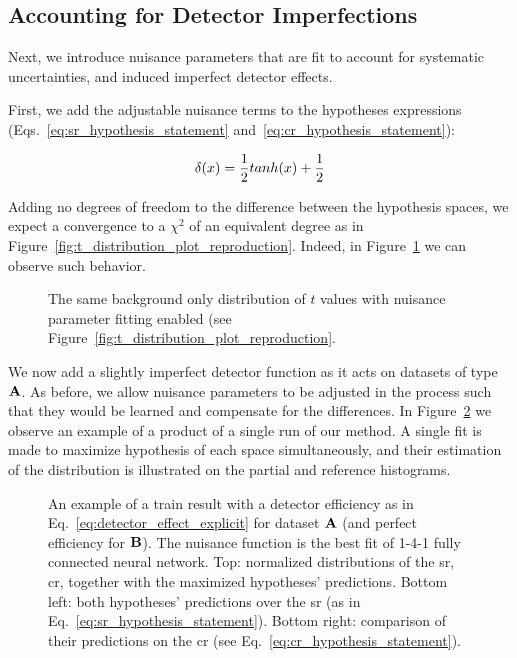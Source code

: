\documentclass[paper/ddppaper2.tex]{subfiles}
\begin{document}
\subsection{Accounting for Detector Imperfections}

Next, we introduce nuisance parameters that are fit to account for systematic uncertainties, and induced imperfect detector effects.

First, we add the adjustable nuisance terms to the hypotheses expressions (Eqs.~\ref{eq:sr_hypothesis_statement} and~\ref{eq:cr_hypothesis_statement}):

\begin{equation}
\label{eq:detector_effect_explicit}
    \delta(\eventsymbol) = \dfrac{1}{2}tanh(\eventsymbol) + \dfrac{1}{2}
\end{equation}

Adding no degrees of freedom to the difference between the hypothesis spaces, we expect a convergence to a $\chi^2$ of an equivalent degree as in Figure~\ref{fig:t_distribution_plot_reproduction}. Indeed, in Figure~\ref{fig:blank-background-with-nuisance} we can observe such behavior.

\begin{figure}
    \caption{The same background only distribution of $t$ values with nuisance parameter fitting enabled (see Figure~\ref{fig:t_distribution_plot_reproduction}.}
    \label{fig:blank-background-with-nuisance}
\end{figure}


We now add a slightly imperfect detector function as it acts on datasets of type ${\mathbf{A}}$. As before, we allow nuisance parameters to be adjusted in the process such that they would be learned and compensate for the differences. In Figure~\ref{fig:detector_effect_with_nuisance_train} we observe an example of a product of a single run of our method. A single fit is made to maximize hypothesis of each space simultaneously, and their estimation of the distribution is illustrated on the partial and reference histograms.

\begin{figure}
    \caption{An example of a train result with a detector efficiency as in Eq.~\ref{eq:detector_effect_explicit} for dataset ${\mathbf{A}}$ (and perfect efficiency for ${\mathbf{B}}$). The nuisance function is the best fit of 1-4-1 fully connected neural network. Top: normalized distributions of the \gls{sr}, \gls{cr}, together with the maximized hypotheses' predictions. Bottom left: both hypotheses' predictions over the \gls{sr} (as in Eq.~\ref{eq:sr_hypothesis_statement}). Bottom right: comparison of their predictions on the \gls{cr} (see Eq.~\ref{eq:cr_hypothesis_statement}).}
    \label{fig:detector_effect_with_nuisance_train}
\end{figure}
\end{document}
